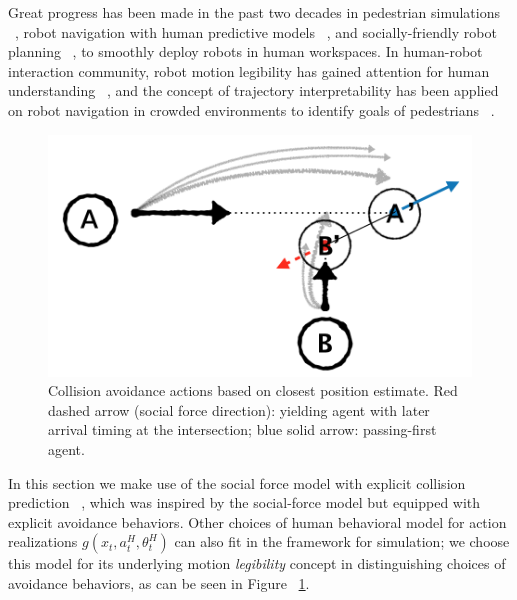 \documentclass[letterpaper, 10 pt, conference]{ieeeconf}  %
\begin{document}
Great progress has been made in the past two decades in pedestrian simulations ~\cite{karamouzas2009predictive,zanlungo2011social}, robot navigation with human predictive models ~\cite{trautman2010unfreezing,kuderer2012feature}, and socially-friendly robot planning ~\cite{mavrogiannis2016decentralized,chen2017socially}, to smoothly deploy robots in human workspaces. In human-robot interaction community, robot motion legibility has gained attention for human understanding ~\cite{dragan2013legibility}, and the concept of trajectory interpretability has been applied on robot navigation in crowded environments to identify goals of pedestrians ~\cite{bai2015intention,unhelkar2015human}. 

   \begin{figure}[t]
      \centering
      \vspace{-1em}
      \includegraphics[scale=0.27]{pedestrian_avoidance}
      \vspace{-1em}
      \caption{Collision avoidance actions based on closest position estimate. 
      Red dashed arrow (social force direction): yielding agent with later 
      arrival timing at the intersection; blue solid arrow: passing-first agent. }
      \vspace{-1.5em}
     \label{fig:legibility}
   \end{figure}

In this section we make use of the social force model with explicit collision prediction ~\cite{zanlungo2011social}, which was inspired by the social-force model but equipped with explicit avoidance behaviors. Other choices of human behavioral model for action realizations 
$g(x_t,a^H_t,\theta^H_t)$ can also fit in the framework for simulation; we choose this model for its underlying motion \textit{legibility} concept in distinguishing choices of avoidance behaviors, as can be seen in Figure ~\ref{fig:legibility}.  
\end{document}
